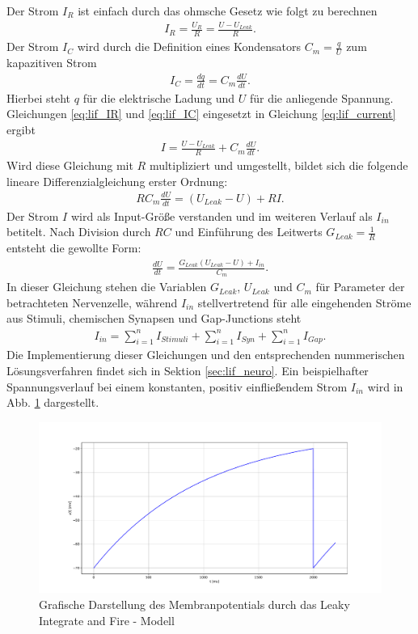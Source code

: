 	Der Strom $I_R$ ist einfach durch das ohmsche Gesetz wie folgt zu berechnen
	\begin{align}
		\label{eq:lif_IR}
		I_R = \frac{U_R}{R} = \frac{U - U_{Leak}}{R}\text{.}
	\end{align}
	Der Strom $I_C$ wird durch die Definition eines Kondensators $C_m = \tfrac{q}{U}$ zum kapazitiven Strom 
	\begin{align}
		\label{eq:lif_IC}
		I_C = \frac{dq}{dt} = C_m \frac{dU}{dt}\text{.}
	\end{align}
	Hierbei steht $q$ für die elektrische Ladung und $U$ für die anliegende Spannung.\\
	Gleichungen \ref{eq:lif_IR} und \ref{eq:lif_IC} eingesetzt in Gleichung \ref{eq:lif_current} ergibt
	\begin{align}
		\label{eq:lif_I}
		I = \frac{U - U_{Leak}}{R} + C_m\frac{dU}{dt}\text{.}
	\end{align}
	Wird diese Gleichung mit $R$ multipliziert und umgestellt, bildet sich die folgende lineare Differenzialgleichung erster Ordnung:
	\begin{align}
		\label{eq:lif_nd}
		R C_m \frac{dU}{dt} = (U_{Leak} - U) + R I\text{.}
	\end{align}
	Der Strom $I$ wird als Input-Größe verstanden und im weiteren Verlauf als $I_{in}$ betitelt. Nach Division durch $RC$ und Einführung des Leitwerts $G_{Leak} = \tfrac{1}{R}$ entsteht die gewollte Form:
	\begin{align}
		\label{eq:lif}
		\frac{dU}{dt} = \frac{G_{Leak}(U_{Leak} - U) + I_{in}}{C_m}\text{.}
	\end{align}
	In dieser Gleichung stehen die Variablen $G_{Leak}$, $U_{Leak}$ und $C_m$ für Parameter der betrachteten Nervenzelle, während $I_{in}$ stellvertretend für alle eingehenden Ströme aus Stimuli, chemischen Synapsen und Gap-Junctions steht
	\begin{align}
		\label{eq:lif_current_in}
		I_{in} = \sum_{i = 1}^{n}{I_{Stimuli}} + \sum_{i = 1}^{n}{I_{Syn}} + \sum_{i = 1}^{n}{I_{Gap}}\text{.}
	\end{align}
	Die Implementierung dieser Gleichungen und den entsprechenden nummerischen Lösungsverfahren findet sich in Sektion \ref{sec:lif_neuro}. Ein beispielhafter Spannungsverlauf bei einem konstanten, positiv einfließendem Strom $I_{in}$ wird in Abb. \ref{fig:simple_lif} dargestellt.
	\begin{figure}[h]
		\centering
		\includegraphics[width=12cm]{figures/chap_lif/Simple_LIF.pdf}
		\caption{Grafische Darstellung des Membranpotentials durch das Leaky Integrate and Fire - Modell}
		\label{fig:simple_lif}
	\end{figure}
